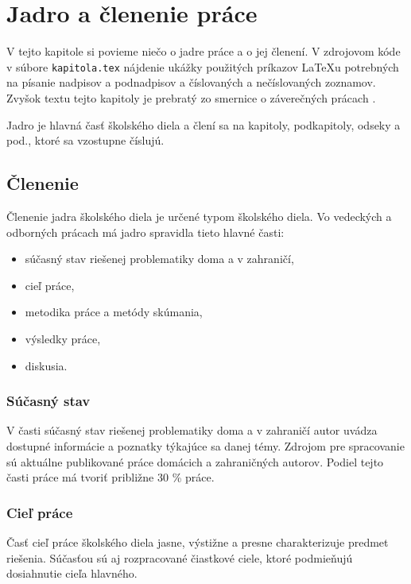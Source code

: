 \chapter{Jadro a členenie práce}

\label{kap:clenenie} %

V tejto kapitole si povieme niečo o jadre práce a o jej členení. V
zdrojovom kóde v súbore \verb'kapitola.tex' nájdenie ukážky použitých
príkazov LaTeXu potrebných na písanie nadpisov a podnadpisov a
číslovaných a nečíslovaných zoznamov. Zvyšok textu tejto kapitoly je
prebratý zo smernice o záverečných prácach \cite[článok 5]{smernica}.

Jadro je hlavná časť školského diela a člení sa na kapitoly,
podkapitoly, odseky a pod., ktoré sa vzostupne číslujú.

\section{Členenie}
Členenie jadra školského diela je určené typom  školského diela. Vo vedeckých 
a odborných prácach má jadro spravidla tieto hlavné časti:
\begin{itemize}
\item  súčasný stav riešenej problematiky doma a v zahraničí,
\item  cieľ práce,
\item  metodika práce a metódy skúmania,
\item  výsledky práce, 
\item  diskusia. 
\end{itemize}

\subsection{Súčasný stav}
V časti súčasný stav riešenej problematiky doma a v zahraničí autor uvádza 
dostupné informácie a poznatky týkajúce sa danej témy. Zdrojom pre spracovanie sú 
aktuálne publikované práce domácich a zahraničných autorov.  Podiel tejto časti práce 
má tvoriť približne 30 \% práce.

\subsection{Cieľ práce}
Časť cieľ práce  školského diela jasne, výstižne a presne charakterizuje predmet 
riešenia. Súčasťou sú aj rozpracované čiastkové ciele, ktoré podmieňujú dosiahnutie 
cieľa hlavného. 

